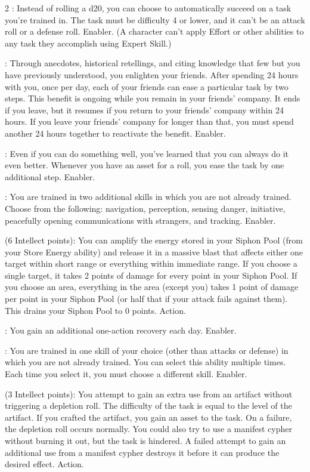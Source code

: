 \begin{multicols}{2}
: Instead of rolling a d20, you can choose to automatically succeed on a task you’re trained in. The task must be difficulty 4 or lower, and it can’t be an attack roll or a defense roll. Enabler. (A character can’t apply Effort or other abilities to any task they accomplish using Expert Skill.)
 
: Through anecdotes, historical retellings, and citing knowledge that few but you have previously understood, you enlighten your friends. After spending 24 hours with you, once per day, each of your friends can ease a particular task by two steps. This benefit is ongoing while you remain in your friends’ company. It ends if you leave, but it resumes if you return to your friends’ company within 24 hours. If you leave your friends’ company for longer than that, you must spend another 24 hours together to reactivate the benefit. Enabler. 
 
: Even if you can do something well, you’ve learned that you can always do it even better. Whenever you have an asset for a roll, you ease the task by one additional step. Enabler. 
 
: You are trained in two additional skills in which you are not already trained. Choose from the following: navigation, perception, sensing danger, initiative, peacefully opening communications with strangers, and tracking. Enabler. 
 
 (6 Intellect points): You can amplify the energy stored in your Siphon Pool (from your Store Energy ability) and release it in a massive blast that affects either one target within short range or everything within immediate range. If you choose a single target, it takes 2 points of damage for every point in your Siphon Pool. If you choose an area, everything in the area (except you) takes 1 point of damage per point in your Siphon Pool (or half that if your attack fails against them). This drains your Siphon Pool to 0 points. Action. 
 
: You gain an additional one-action recovery each day. Enabler. 
 
: You are trained in one skill of your choice (other than attacks or defense) in which you are not already trained. You can select this ability multiple times. Each time you select it, you must choose a different skill. Enabler.
 
 (3 Intellect points): You attempt to gain an extra use from an artifact without triggering a depletion roll. The difficulty of the task is equal to the level of the artifact. If you crafted the artifact, you gain an asset to the task. On a failure, the depletion roll occurs normally. You could also try to use a manifest cypher without burning it out, but the task is hindered. A failed attempt to gain an additional use from a manifest cypher destroys it before it can produce the desired effect. Action. 
 

\end{multicols}
